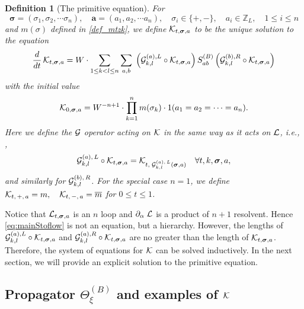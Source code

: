 \documentclass[10pt,reqno]{article}
\newcommand{\be}{\begin{equation}}
\newcommand{\ee}{\end{equation}}
\theoremstyle{plain} %
\newtheorem{definition}[theorem]{Definition}
\theoremstyle{remark}
\numberwithin{equation}{section}
\begin{document}
\begin{definition}[The primitive equation]\label{Def_Ktza}
For 
$$
\boldsymbol{\sigma}=(\sigma_1, \sigma_2, \cdots \sigma_n),\quad 
\boldsymbol{a}=(a_1, a_2, \cdots a_n)
,\quad \sigma_i \in \{+,-\}, \quad
a_i\in \mathbb Z_L, \quad 1\le i\le n
$$
and  $m(\sigma)$ defined in \eqref{def_mtzk}, we define  ${\cal K}_{t, \boldsymbol{\sigma}, \textbf{a}}$ to be the unique solution to the equation 
 \begin{align}\label{pro_dyncalK}
       \frac{d}{dt}\,{\cal K}_{t, \boldsymbol{\sigma}, \textbf{a}} 
       =  
       {W}\cdot  \sum_{1 \le k < l \le n} \sum_{a, b} \; \left( {\cal G}^{(a), L}_{k, l} \circ {\cal K}_{t, \boldsymbol{\sigma}, \textbf{a}} \right) S^{(B)}_{ab} \left( {\cal G}^{(b), R}_{k, l} \circ {\cal K}_{t, \boldsymbol{\sigma}, \textbf{a}} \right)  
    \end{align}
with the initial value 
$$
    {\cal K}_{0, \boldsymbol{\sigma}, \textbf{a}} =  {W^{-n+1}} \cdot \prod_{k=1}^n m (\sigma_k) \cdot \textbf{1}(a_1 = a_2 = \cdots = a_n).
$$
Here we define the ${\cal G}$ operator acting on ${\cal K}$ in the same way as it acts on ${\cal L}$,  i.e., ,  
  \be\label{calGonIND}
     {\cal G}^{(a),\,L }_{k,l}  \circ {\cal K}_{t, \boldsymbol{\sigma}, \textbf{a}} = {\cal K}_{t, \; {\cal G}^{(a),\,L }_{k,l}  (\boldsymbol{\sigma}, \textbf{a})}  \quad \forall t, k, \boldsymbol{\sigma}, \textbf{a},   
       \ee
and similarly for  ${\cal G}^{(b),\, R }_{k,l}$. 
For the special case $n=1$, we define %
$
{\cal K}_{t,\,+,\, a}=m,\quad {\cal K}_{t,\,-,\, a}=\overline m$ for $0\le t\le 1$. 
\end{definition}

Notice that  ${\cal L}_{t, \boldsymbol{\sigma}, \textbf{a}}$ is an $n$ loop and $\partial_{  \alpha} \; {\cal L}$ is a product of  $n+1$  resolvent. Hence  \eqref{eq:mainStoflow} is not an equation, but  a hierarchy. However, the  lengths of ${\cal G}^{(a), L}_{k, l} \circ {\cal K}_{t, \boldsymbol{\sigma}, \textbf{a}}$ and ${\cal G}^{(a), R}_{k, l} \circ {\cal K}_{t, \boldsymbol{\sigma}, \textbf{a}}$ are no greater than the  length of ${\cal K}_{t, \boldsymbol{\sigma}, \textbf{a}}$. Therefore, 
the system of equations for $\cal K$ can be solved inductively. 
 In the next section, we will provide an explicit  solution to the primitive equation.  

\subsection{Propagator \texorpdfstring{$\Theta_\xi^{(B)}$}{Theta} and examples of \texorpdfstring{${\cal K}$}{ K}}
 
\end{document}
